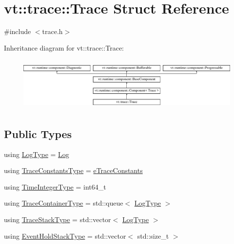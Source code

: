 \hypertarget{structvt_1_1trace_1_1_trace}{}\section{vt\+:\+:trace\+:\+:Trace Struct Reference}
\label{structvt_1_1trace_1_1_trace}


{\ttfamily \#include $<$trace.\+h$>$}

Inheritance diagram for vt\+:\+:trace\+:\+:Trace\+:\begin{figure}[H]
\begin{center}
\leavevmode
\includegraphics[height=2.765432cm]{structvt_1_1trace_1_1_trace}
\end{center}
\end{figure}
\subsection*{Public Types}
\begin{DoxyCompactItemize}
\item 
using \hyperlink{structvt_1_1trace_1_1_trace_a43306d96a91e49db081eaea016f1dd0a}{Log\+Type} = \hyperlink{structvt_1_1trace_1_1_log}{Log}
\item 
using \hyperlink{structvt_1_1trace_1_1_trace_accb35b20499dfdd46e6c79daae9fc265}{Trace\+Constants\+Type} = \hyperlink{namespacevt_1_1trace_acf454dfbd581b0ebae895f90b5927a1d}{e\+Trace\+Constants}
\item 
using \hyperlink{structvt_1_1trace_1_1_trace_ab8db9218a8ab87f59773fcbf81433787}{Time\+Integer\+Type} = int64\+\_\+t
\item 
using \hyperlink{structvt_1_1trace_1_1_trace_a9d07ee9d9e92f63674da9954cfe9830b}{Trace\+Container\+Type} = std\+::queue$<$ \hyperlink{structvt_1_1trace_1_1_trace_a43306d96a91e49db081eaea016f1dd0a}{Log\+Type} $>$
\item 
using \hyperlink{structvt_1_1trace_1_1_trace_af27d223028d10a196680513defcef3d6}{Trace\+Stack\+Type} = std\+::vector$<$ \hyperlink{structvt_1_1trace_1_1_trace_a43306d96a91e49db081eaea016f1dd0a}{Log\+Type} $>$
\item 
using \hyperlink{structvt_1_1trace_1_1_trace_a727542f4171681f2ef03df2c3abce04c}{Event\+Hold\+Stack\+Type} = std\+::vector$<$ std\+::size\+\_\+t $>$
\end{DoxyCompactItemize}
